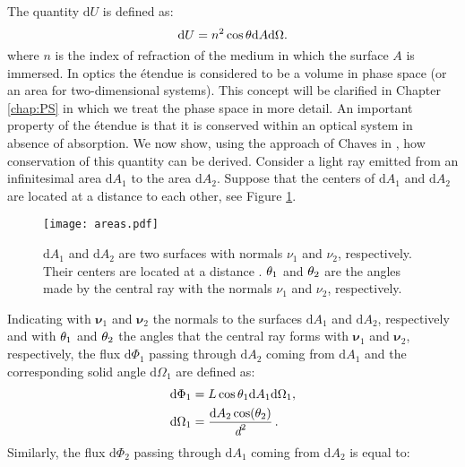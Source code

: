The quantity $ \textrm{d}U $ is defined as:
\begin{equation}\label{etendue}
\textrm{d}U = n^2 \cos\theta\textrm{d}A\textrm{d}\Omega.
\end{equation}
where $n$ is the index of refraction of the medium in which the surface $A$ is immersed. In optics the \'{e}tendue is considered to be a volume in phase space  (or an area for two-dimensional systems). This concept will be clarified in Chapter \ref{chap:PS} in which we treat the phase space in more detail.
An important property of the \'{e}tendue is that it is conserved within an optical system in absence of absorption. We now show, using the approach of Chaves in \cite{chaves2015introduction}, 
how conservation of this quantity can be derived.
Consider a light ray emitted from an infinitesimal area $\textrm{d}A_1$ to the area $\textrm{d}A_2$. Suppose that the centers of $\textrm{d}A_1$ and $\textrm{d}A_2$ 
are located at a distance  to each other,  see Figure \ref{fig:etendue_conservation}.
\begin{figure}[h]
 \label{fig:etendue_conservation}
     \begin{center}
     \texttt{[image: areas.pdf]}
     \end{center}
     \caption{$\textrm{d}A_1$ and $\textrm{d}A_2$ are two surfaces with normals $\nu_1$ and $\nu_2$, respectively. Their centers are located at a distance .
$\theta_1$ and $\theta_2$ are the angles made by the central ray with the normals $\nu_1$ and $\nu_2$, respectively.}
\label{fig:etendue_conservation}
 \end{figure}
Indicating with $\boldsymbol{\nu}_1$ and $\boldsymbol{\nu}_2$ the normals to the surfaces $\textrm{d}A_1$ and $\textrm{d}A_2$, respectively and with $\theta_1$ and $\theta_2$ the angles that the central ray forms with $\boldsymbol{\nu}_1$ and $\boldsymbol{\nu}_2$, respectively,
the flux $\textrm{d}\Phi_1$ passing through $\textrm{d}A_2$ coming from $\textrm{d}A_1$ and the corresponding solid angle $\textrm{d}\Omega_1 $ are defined as:
\begin{equation}
\begin{split}
\textrm{d}\Phi_1 &= L \cos\theta_1 \textrm{d}A_1 \textrm{d}\Omega_1, \\
\textrm{d}\Omega_1 &= \frac{\textrm{d}A_2\cos(\theta_2)}{\textit{d}^2}\,.
\end{split}
\end{equation}
Similarly, the flux $\textrm{d}\Phi_2$ passing through $\textrm{d}A_1$ coming from $\textrm{d}A_2$ is equal to:
